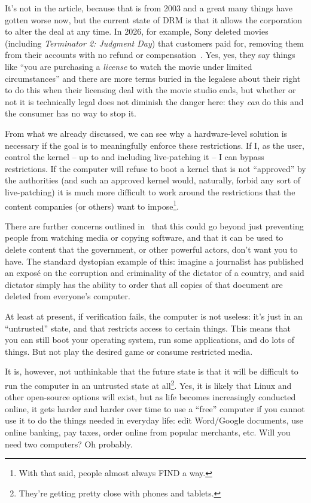 It's not in the article, because that is from 2003 and a great many things have gotten worse now, but the current state of DRM is that it allows the corporation to alter the deal at any time. In 2026, for example, Sony deleted movies (including \textit{Terminator 2: Judgment Day}) that customers paid for, removing them from their accounts with no refund or compensation~\cite{ps-delete-movie}. Yes, yes, they say things like ``you are purchasing a \textit{license} to watch the movie under limited circumstances'' and there are more terms buried in the legalese about their right to do this when their licensing deal with the movie studio ends, but whether or not it is technically legal does not diminish the danger here: they \textit{can} do this and the consumer has no way to stop it.

From what we already discussed, we can see why a hardware-level solution is necessary if the goal is to meaningfully enforce these restrictions. If I, as the user, control the kernel -- up to and including live-patching it -- I can bypass restrictions. If the computer will refuse to boot a kernel that is not ``approved'' by the authorities (and such an approved kernel would, naturally, forbid any sort of live-patching) it is much more difficult to work around the restrictions that the content companies (or others) want to impose\footnote{With that said, people almost always FIND a way.}.

There are further concerns outlined in~\cite{tc} that this could go beyond just preventing people from watching media or copying software, and that it can be used to delete content that the government, or other powerful actors, don't want you to have. The standard dystopian example of this: imagine a journalist has published an expos\'e on the corruption and criminality of the dictator of a country, and said dictator simply has the ability to order that all copies of that document are deleted from everyone's computer.

At least at present, if verification fails, the computer is not useless: it's just in an ``untrusted'' state, and that restricts access to certain things. This means that you can still boot your operating system, run some applications, and do lots of things. But not play the desired game or consume restricted media. 

It is, however, not unthinkable that the future state is that it will be difficult to run the computer in an untrusted state at all\footnote{They're getting pretty close with phones and tablets.}. Yes, it is likely that Linux and other open-source options will exist, but as life becomes increasingly conducted online, it gets harder and harder over time to use a ``free'' computer if you cannot use it to do the things needed in everyday life: edit Word/Google documents, use online banking, pay taxes, order online from popular merchants, etc. Will you need two computers? Oh probably.

